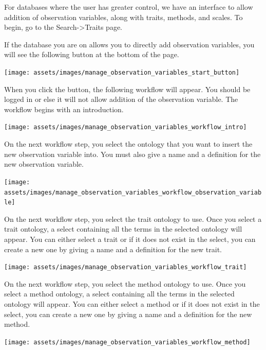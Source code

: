 \documentclass[
  12pt,
]{book}
\begin{document}
For databases where the user has greater control, we have an interface to allow addition of observation variables, along with traits, methods, and scales. To begin, go to the Search-\textgreater Traits page.

If the database you are on allows you to directly add observation variables, you will see the following button at the bottom of the page.

\begin{center}\texttt{[image: assets/images/manage\_observation\_variables\_start\_button]} \end{center}

When you click the button, the following workflow will appear. You should be logged in or else it will not allow addition of the observation variable. The workflow begins with an introduction.

\begin{center}\texttt{[image: assets/images/manage\_observation\_variables\_workflow\_intro]} \end{center}

On the next workflow step, you select the ontology that you want to insert the new observation variable into. You must also give a name and a definition for the new observation variable.

\begin{center}\texttt{[image: assets/images/manage\_observation\_variables\_workflow\_observation\_variable]} \end{center}

On the next workflow step, you select the trait ontology to use. Once you select a trait ontology, a select containing all the terms in the selected ontology will appear. You can either select a trait or if it does not exist in the select, you can create a new one by giving a name and a definition for the new trait.

\begin{center}\texttt{[image: assets/images/manage\_observation\_variables\_workflow\_trait]} \end{center}

On the next workflow step, you select the method ontology to use. Once you select a method ontology, a select containing all the terms in the selected ontology will appear. You can either select a method or if it does not exist in the select, you can create a new one by giving a name and a definition for the new method.

\begin{center}\texttt{[image: assets/images/manage\_observation\_variables\_workflow\_method]} \end{center}
\end{document}
